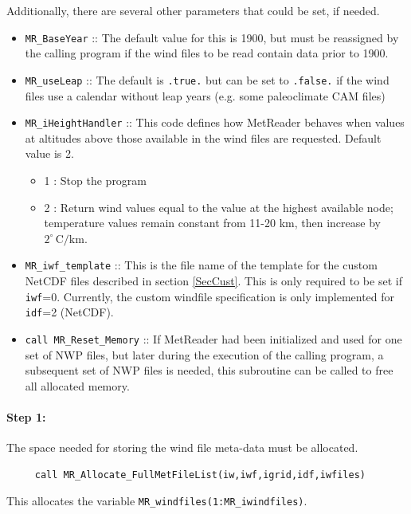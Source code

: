 \documentclass[11pt]{article}   %
\begin{document}
Additionally, there are several other parameters that could be set, if needed.
\begin{itemize}
\item \texttt{MR\_BaseYear} :: The default value for this is 1900, but must be
reassigned by the calling program if the wind files to be read contain data prior to 1900.
\item \texttt{MR\_useLeap} :: The default is \texttt{.true.} but can be set to \texttt{.false.}
if the wind files use a calendar without leap years (e.g. some paleoclimate CAM files)
\item \texttt{MR\_iHeightHandler} :: This code defines how MetReader behaves when values at
altitudes above those available in the wind files are requested.  Default value is 2.
 \begin{itemize}
 \item   1 : Stop the program
 \item   2 : Return wind values equal to the value at the highest available node; temperature
values remain constant from 11-20 km, then increase by $2^{\circ} \, \mathrm{C/km}$.
 \end{itemize}
\item \texttt{MR\_iwf\_template} :: This is the file name of the template for the
custom NetCDF files described in section \ref{SecCust}.  This is only required to be set
if \texttt{iwf}=0.  Currently, the custom windfile specification is only implemented for
\texttt{idf}=2 (NetCDF).
\item \texttt{call MR\_Reset\_Memory} :: If MetReader had been initialized and used for
one set of NWP files, but later during the execution of the calling program, a subsequent
set of NWP files is needed, this subroutine can be called to free all allocated memory.
\end{itemize}

\paragraph{Step 1:} The space needed for storing the wind file meta-data must be allocated.
\begin{verbatim}
     call MR_Allocate_FullMetFileList(iw,iwf,igrid,idf,iwfiles)
\end{verbatim}
This allocates the variable \texttt{MR\_windfiles(1:MR\_iwindfiles)}.
\end{document}
